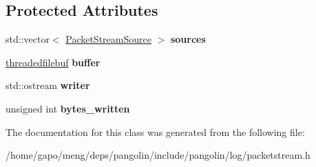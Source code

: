 \subsection*{Protected Attributes}
\begin{DoxyCompactItemize}
\item 
std\+::vector$<$ \hyperlink{structpangolin_1_1_packet_stream_source}{Packet\+Stream\+Source} $>$ {\bfseries sources}\hypertarget{classpangolin_1_1_packet_stream_writer_a3865a3f75df0d38b8693a9492ac69285}{}\label{classpangolin_1_1_packet_stream_writer_a3865a3f75df0d38b8693a9492ac69285}

\item 
\hyperlink{classpangolin_1_1threadedfilebuf}{threadedfilebuf} {\bfseries buffer}\hypertarget{classpangolin_1_1_packet_stream_writer_adc2cdfb08279b9d1c8902885513cfd56}{}\label{classpangolin_1_1_packet_stream_writer_adc2cdfb08279b9d1c8902885513cfd56}

\item 
std\+::ostream {\bfseries writer}\hypertarget{classpangolin_1_1_packet_stream_writer_ae00f3814caaa4890d7eb2f19e77c0c97}{}\label{classpangolin_1_1_packet_stream_writer_ae00f3814caaa4890d7eb2f19e77c0c97}

\item 
unsigned int {\bfseries bytes\+\_\+written}\hypertarget{classpangolin_1_1_packet_stream_writer_a66cb0699dcdb321bb6b3e160b3dbba5c}{}\label{classpangolin_1_1_packet_stream_writer_a66cb0699dcdb321bb6b3e160b3dbba5c}

\end{DoxyCompactItemize}


The documentation for this class was generated from the following file\+:\begin{DoxyCompactItemize}
\item 
/home/gapo/meng/deps/pangolin/include/pangolin/log/packetstream.\+h\end{DoxyCompactItemize}
